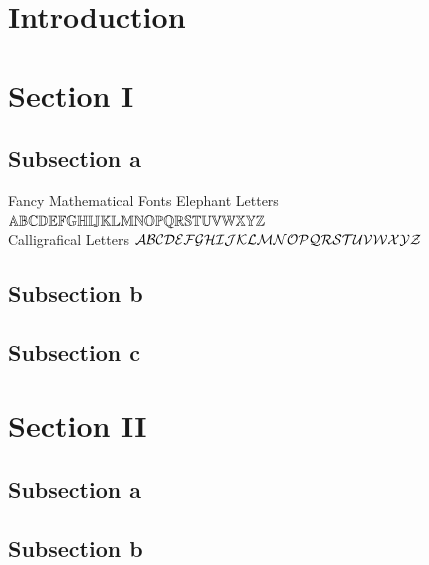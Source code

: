 \documentclass[aspectratio=169, 10pt]{beamer}
\theoremstyle{definition}
\begin{document}
\section{Introduction}
\section{Section I}
\subsection{Subsection a}
\begin{frame}{Fancy Mathematical Fonts}
Elephant Letters\hfill
  \(
    \mathbb{A}
    \mathbb{B}
    \mathbb{C}
    \mathbb{D}
    \mathbb{E}
    \mathbb{F}
    \mathbb{G}
    \mathbb{H}
    \mathbb{I}
    \mathbb{J}
    \mathbb{K}
    \mathbb{L}
    \mathbb{M}
    \mathbb{N}
    \mathbb{O}
    \mathbb{P}
    \mathbb{Q}
    \mathbb{R}
    \mathbb{S}
    \mathbb{T}
    \mathbb{U}
    \mathbb{V}
    \mathbb{W}
    \mathbb{X}
    \mathbb{Y}
    \mathbb{Z}
  \)\\


  Calligrafical Letters\hfill
  \(
    \mathcal{A}
    \mathcal{B}
    \mathcal{C}
    \mathcal{D}
    \mathcal{E}
    \mathcal{F}
    \mathcal{G}
    \mathcal{H}
    \mathcal{I}
    \mathcal{J}
    \mathcal{K}
    \mathcal{L}
    \mathcal{M}
    \mathcal{N}
    \mathcal{O}
    \mathcal{P}
    \mathcal{Q}
    \mathcal{R}
    \mathcal{S}
    \mathcal{T}
    \mathcal{U}
    \mathcal{V}
    \mathcal{W}
    \mathcal{X}
    \mathcal{Y}
    \mathcal{Z}
  \)
\end{frame}
\subsection{Subsection b}
\subsection{Subsection c}
\section{Section II}
\subsection{Subsection a}
\subsection{Subsection b}
\end{document}
